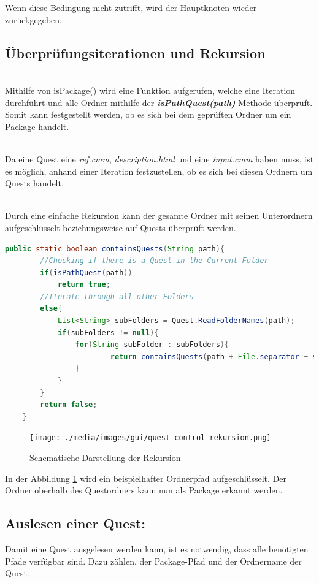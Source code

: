 Wenn diese Bedingung nicht zutrifft, wird der Hauptknoten wieder zurückgegeben.

\subsection{Überprüfungsiterationen und Rekursion}
\\
Mithilfe von isPackage() wird eine Funktion aufgerufen, welche eine Iteration durchführt und alle Ordner mithilfe der \textit{\textbf{isPathQuest(path)}} Methode überprüft. Somit kann festgestellt werden, ob es sich bei dem geprüften Ordner um ein Package handelt.

\\
Da eine Quest eine \textit{ref.cmm}, \textit{description.html} und eine \textit{input.cmm} haben muss, ist es möglich, anhand einer Iteration festzustellen, ob es sich bei diesen Ordnern um Quests handelt.

\\
Durch eine einfache Rekursion kann der gesamte Ordner mit seinen Unterordnern aufgeschlüsselt beziehungsweise auf Quests überprüft werden.

\begin{lstlisting}[language=JAVA]
	public static boolean containsQuests(String path){
		//Checking if there is a Quest in the Current Folder
		if(isPathQuest(path))
			return true;
		//Iterate through all other Folders
		else{
			List<String> subFolders = Quest.ReadFolderNames(path);
			if(subFolders != null){
				for(String subFolder : subFolders){
						return containsQuests(path + File.separator + subFolder);
				}
			}
		}
		return false;
	}
\end{lstlisting}



\begin{figure}[h] 
  \centering
     \texttt{[image: ./media/images/gui/quest-control-rekursion.png]}
  \caption{Schematische Darstellung der Rekursion}
  \label{fig:JTree_Control_Rekursion}
\end{figure}

In der Abbildung \ref{fig:JTree_Control_Rekursion} wird ein beispielhafter Ordnerpfad aufgeschlüsselt. Der Ordner oberhalb des Questordners kann nun als Package erkannt werden.

\subsection{Auslesen einer Quest:}
Damit eine Quest ausgelesen werden kann, ist es notwendig, dass alle benötigten Pfade verfügbar sind. Dazu zählen, der Package-Pfad und der Ordnername der Quest.

